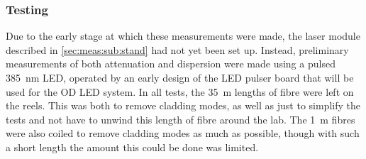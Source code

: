 \documentclass[a4paper,11pt]{article}
\begin{document}
\subsubsection{Testing}\label{sec:meas:sub:init:sub:test}

Due to the early stage at which these measurements were made, the laser module described in \cref{sec:meas:sub:stand} had not yet been set up. Instead, preliminary measurements of both attenuation and dispersion were made using a pulsed 385~nm LED, operated by an early design of the LED pulser board that will be used for the OD LED system. In all tests, the 35~m lengths of fibre were left on the reels. This was both to remove cladding modes, as well as just to simplify the tests and not have to unwind this length of fibre around the lab. The 1~m fibres were also coiled to remove cladding modes as much as possible, though with such a short length the amount this could be done was limited.
\end{document}
